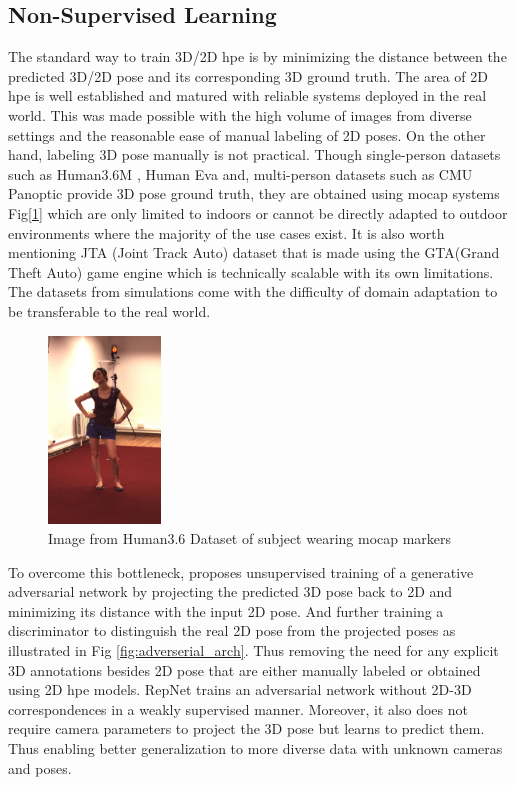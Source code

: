 \subsection{Non-Supervised Learning}
\label{subsec:non_supervised_learning}
The standard way to train 3D/2D \ac{hpe} is by minimizing the distance between the predicted 3D/2D pose and its corresponding 3D ground truth. The area of 2D \ac{hpe} is well established and matured with reliable systems deployed in the real world. This was made possible with the high volume of images from diverse settings and the reasonable ease of manual labeling of 2D poses. On the other hand, labeling 3D pose manually is not practical. Though single-person datasets such as Human3.6M \cite{H3.6}, Human Eva \cite{HumanEva} and, multi-person datasets such as CMU Panoptic \cite{cmuPanoptic} provide 3D pose ground truth, they are obtained using \ac{mocap} systems Fig[\ref{fig:h36_mocap}] which are only limited to indoors or cannot be directly adapted to outdoor environments where the majority of the use cases exist. It is also worth mentioning JTA (Joint Track Auto) dataset \cite{JTA} that is made using the GTA(Grand Theft Auto) game engine which is technically scalable with its own limitations. The datasets from simulations come with the difficulty of domain adaptation to be transferable to the real world.

\begin{figure}[!h]
    \centering
    \includegraphics[width=30mm]{figures/h36/h36_mocap.png}
    \caption{Image from Human3.6 Dataset \cite{H3.6} of subject wearing \ac{mocap} markers}
    \label{fig:h36_mocap}
\end{figure}

To overcome this bottleneck, \cite{unsupervisedAdversarial} proposes unsupervised training of a generative adversarial network by projecting the predicted 3D pose back to 2D and minimizing its distance with the input 2D pose. And further training a discriminator to distinguish the real 2D pose from the projected poses as illustrated in Fig \ref{fig:adverserial_arch}. Thus removing the need for any explicit 3D annotations besides 2D pose that are either manually labeled or obtained using 2D \ac{hpe} models. RepNet \cite{repnet} trains an adversarial network without 2D-3D correspondences in a weakly supervised manner. Moreover, it also does not require camera parameters to project the 3D pose but learns to predict them. Thus enabling better generalization to more diverse data with unknown cameras and poses.


